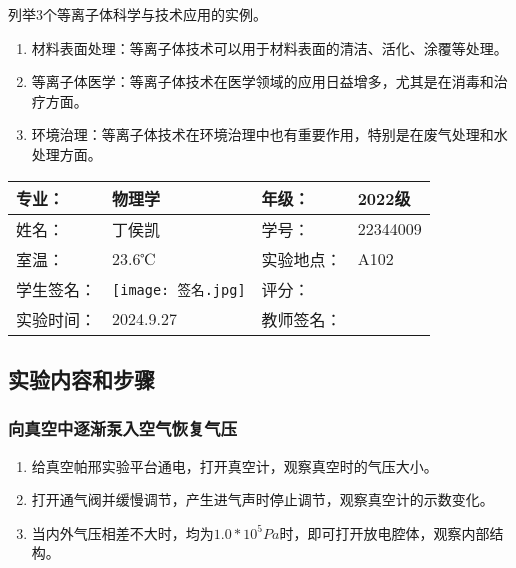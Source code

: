 \documentclass[dvipsnames, svgnames,a4paper,11pt]{article}
\begin{document}
\begin{question}
	列举3个等离子体科学与技术应用的实例。	
\end{question}
\begin{enumerate}
	\item 材料表面处理：等离子体技术可以用于材料表面的清洁、活化、涂覆等处理。
	
	\item 等离子体医学：等离子体技术在医学领域的应用日益增多，尤其是在消毒和治疗方面。
	
	\item 环境治理：等离子体技术在环境治理中也有重要作用，特别是在废气处理和水处理方面。

\end{enumerate}

\clearpage

\begin{table}
	\renewcommand\arraystretch{1.7}
	\centering
	\begin{tabularx}{\textwidth}{|X|X|X|X|}
	\hline
	专业：& 物理学 &年级：& 2022级 \\
	\hline
	姓名： & 丁侯凯& 学号：&22344009\\
	\hline
	室温：& 23.6℃& 实验地点： & A102\\
	\hline
	学生签名：& \texttt{[image: 签名.jpg]}
	& 评分： &\\
	\hline
	实验时间：&2024.9.27 & 教师签名：&\\
	\hline
	\end{tabularx}
\end{table}

\subsection{实验内容和步骤}
	\subsubsection{向真空中逐渐泵入空气恢复气压}
	\begin{enumerate}
		\item 给真空帕邢实验平台通电，打开真空计，观察真空时的气压大小。
		\item 打开通气阀并缓慢调节，产生进气声时停止调节，观察真空计的示数变化。
		\item 当内外气压相差不大时，均为$1.0*10^5Pa$时，即可打开放电腔体，观察内部结构。
	\end{enumerate}
\end{document}
